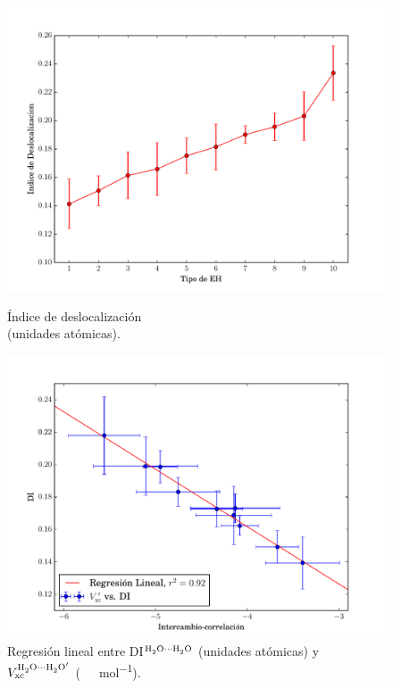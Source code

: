 \begin{figure}[h]
    \begin{minipage}[t]{0.50\textwidth}
      \centering
      \includegraphics[width=\textwidth]{4/img/DI}
      \caption{Índice de deslocalización \\(unidades atómicas).}
      \label{DI}
    \end{minipage}%
    \hfill
    \begin{minipage}[t]{0.50\textwidth}
      \centering
      \includegraphics[width=\textwidth]{4/img/XC_vs_di}
      \caption{Regresión lineal entre DI$^{\ce{H2O\bond{...}H2O}}$ (unidades atómicas) y $V_{\mathrm{xc}}^{\ce{H2O\bond{...}H2O^{\prime}}}$ (\SI{}{\kilo \calorie \per \mole}).}
      \label{XC_vs_di}
    \end{minipage}%
\end{figure}


